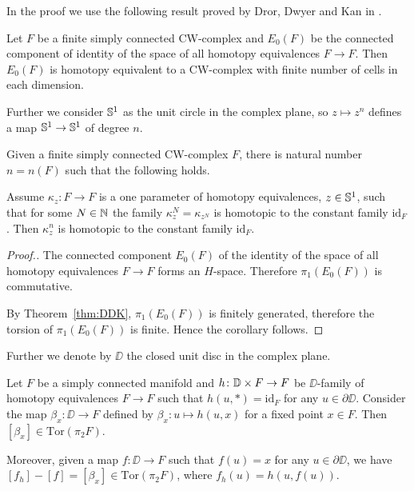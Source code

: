 \documentclass{amsart}
\begin{document}
In the proof we use the following result proved by Dror,  Dwyer and Kan in \cite{DDK}.

\begin{thm}\label{thm:DDK}
Let $F$ be a finite simply connected CW-complex and 
$E_0(F)$ be the connected component of identity of the 
space of all homotopy equivalences $F\to F$. Then $E_0(F)$ is homotopy equivalent to a CW-complex with finite number of cells in each dimension.
\end{thm}

Further we consider ${\Bbb S}^1$ as the unit circle in the complex plane, so  $z\mapsto z^n$ defines a map ${\Bbb S}^1\to {\Bbb S}^1$ of degree $n$.

\begin{cor}\label{cor:DDK}
Given a finite simply connected CW-complex $F$, there is natural number $n=n(F)$ such that the following  holds.

Assume
$\kappa_z\colon F\to F$ is a one parameter of homotopy equivalences, $z\in{\Bbb S}^1$,
such that for some $N\in{\Bbb N}$ the family $\kappa^N_z=\kappa_{z^N}$ is homotopic to the constant family $\mathrm{id}_F$. 
Then $\kappa^n_z$ is homotopic to the constant family $\mathrm{id}_F$.
\end{cor}

\begin{proof}[Proof.]
The connected component $E_0(F)$ of the identity of the 
space of all homotopy equivalences $F\to F$ forms an $H$-space. 
Therefore $\pi_1(E_0(F))$ is commutative. 

By Theorem~\ref{thm:DDK}, $\pi_1(E_0(F))$ is finitely generated,
therefore the torsion of $\pi_1(E_0(F))$ is finite.
Hence the corollary follows.
\end{proof}

Further we denote by $\DD$ the closed unit disc in the complex plane.

\begin{techlem}\label{techlem}
Let $F$ be a simply connected manifold and $h\colon \DD\times F\z\to F$ be 
$\DD$-family of homotopy equivalences $F\to F$ such that $h(u,*)=\mathrm{id}_F$ for any
$u\in\partial \DD$. 
Consider the map $\beta_x\colon \DD\to F$ defined by $\beta_x\colon u\mapsto h(u,x)$ for a fixed point $x\in F$. 
Then $[\beta_x]\in \mathrm{Tor}(\pi_2F)$.

Moreover, given a map $f\colon \DD\to F$ such that $f(u)=x$ for any $u\in\partial \DD$, we have 
$[f_h]-[f]=[\beta_x]\in \mathrm{Tor}(\pi_2F)$, 
where $f_h(u)=h(u,f(u))$. 
\end{techlem}
\end{document}
